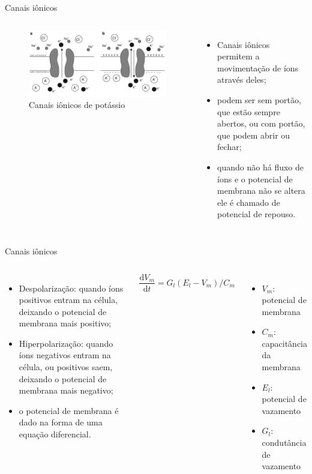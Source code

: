 \begin{frame}{Canais iônicos}
	\begin{columns}[t]
		\column{5cm}
			\begin{figure}[tb!]
				\centering
				\caption{Canais iônicos de potássio}
				\label{fig:canaisions}
				\includegraphics[width=\linewidth]{figs/canais_ions}
			\end{figure}
		\column{5cm}
			\begin{itemize}
				\item Canais iônicos permitem a movimentação de íons através deles;
				\item podem ser sem portão, que estão sempre abertos, ou com portão, que podem abrir ou fechar;
				\item quando não há fluxo de íons e o potencial de membrana não se altera ele é chamado de potencial de repouso.
			\end{itemize}
	\end{columns}
\end{frame}

\begin{frame}{Canais iônicos}
	\begin{columns}[t]
		\column{5cm}
			\begin{itemize}
				\item Despolarização: quando íons positivos entram na célula, deixando o potencial de membrana mais positivo;
				\item Hiperpolarização: quando íons negativos entram na célula, ou positivos saem, deixando o potencial de membrana mais negativo;
				\item o potencial de membrana é dado na forma de uma equação diferencial.
			\end{itemize}
		\column{5cm}
			\[
				\frac{\mathrm{d}V_m}{\mathrm{d}t}=G_l(E_l-V_m)/C_m
			\]
			\begin{itemize}
				\item $V_m$: potencial de membrana
				\item $C_m$: capacitância da membrana
				\item $E_l$: potencial de vazamento
				\item $G_l$: condutância de vazamento
			\end{itemize}
	\end{columns}
\end{frame}

